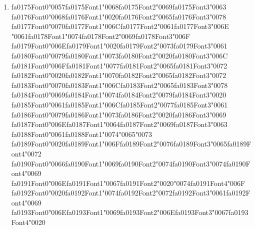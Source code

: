 \documentclass[12pt]{article}
\begin{document}
\begin{enumerate}[label=Q\arabic*.]
 \item {\csname fa0175Font0\endcsname\char"0057}{\csname fa0175Font1\endcsname\char"0068}{\csname fa0175Font2\endcsname\char"0069}{\csname fa0175Font3\endcsname\char"0063} {\csname fa0176Font0\endcsname\char"0068}{\csname fa0176Font1\endcsname\char"0020}{\csname fa0176Font2\endcsname\char"0065}{\csname fa0176Font3\endcsname\char"0078} {\csname fa0177Font0\endcsname\char"0070}{\csname fa0177Font1\endcsname\char"006C}{\csname fa0177Font2\endcsname\char"0061}{\csname fa0177Font3\endcsname\char"006E} {\char"0061}{\csname fa0178Font1\endcsname\char"0074}{\csname fa0178Font2\endcsname\char"0069}{\csname fa0178Font3\endcsname\char"006F} {\csname fa0179Font0\endcsname\char"006E}{\csname fa0179Font1\endcsname\char"0020}{\csname fa0179Font2\endcsname\char"0073}{\csname fa0179Font3\endcsname\char"0061} {\csname fa0180Font0\endcsname\char"0079}{\csname fa0180Font1\endcsname\char"0073}{\csname fa0180Font2\endcsname\char"0020}{\csname fa0180Font3\endcsname\char"006C} {\csname fa0181Font0\endcsname\char"006F}{\csname fa0181Font1\endcsname\char"0077}{\csname fa0181Font2\endcsname\char"0065}{\csname fa0181Font3\endcsname\char"0072} {\csname fa0182Font0\endcsname\char"0020}{\csname fa0182Font1\endcsname\char"0070}{\csname fa0182Font2\endcsname\char"0065}{\csname fa0182Font3\endcsname\char"0072} {\csname fa0183Font0\endcsname\char"0070}{\csname fa0183Font1\endcsname\char"006C}{\csname fa0183Font2\endcsname\char"0065}{\csname fa0183Font3\endcsname\char"0078} {\csname fa0184Font0\endcsname\char"0069}{\csname fa0184Font1\endcsname\char"0074}{\csname fa0184Font2\endcsname\char"0079}{\csname fa0184Font3\endcsname\char"0020} {\csname fa0185Font0\endcsname\char"0061}{\csname fa0185Font1\endcsname\char"006C}{\csname fa0185Font2\endcsname\char"0077}{\csname fa0185Font3\endcsname\char"0061} {\csname fa0186Font0\endcsname\char"0079}{\csname fa0186Font1\endcsname\char"0073}{\csname fa0186Font2\endcsname\char"0020}{\csname fa0186Font3\endcsname\char"0069} {\csname fa0187Font0\endcsname\char"006E}{\csname fa0187Font1\endcsname\char"0064}{\csname fa0187Font2\endcsname\char"0069}{\csname fa0187Font3\endcsname\char"0063} {\csname fa0188Font0\endcsname\char"0061}{\csname fa0188Font1\endcsname\char"0074}{\char"0065}{\char"0073} {\csname fa0189Font0\endcsname\char"0020}{\csname fa0189Font1\endcsname\char"006F}{\csname fa0189Font2\endcsname\char"0076}{\csname fa0189Font3\endcsname\char"0065}{\csname fa0189Font4\endcsname\char"0072} {\csname fa0190Font0\endcsname\char"0066}{\csname fa0190Font1\endcsname\char"0069}{\csname fa0190Font2\endcsname\char"0074}{\csname fa0190Font3\endcsname\char"0074}{\csname fa0190Font4\endcsname\char"0069} {\csname fa0191Font0\endcsname\char"006E}{\csname fa0191Font1\endcsname\char"0067}{\csname fa0191Font2\endcsname\char"0020}{\char"0074}{\csname fa0191Font4\endcsname\char"006F} {\csname fa0192Font0\endcsname\char"0020}{\csname fa0192Font1\endcsname\char"0074}{\csname fa0192Font2\endcsname\char"0072}{\csname fa0192Font3\endcsname\char"0061}{\csname fa0192Font4\endcsname\char"0069} {\csname fa0193Font0\endcsname\char"006E}{\csname fa0193Font1\endcsname\char"0069}{\csname fa0193Font2\endcsname\char"006E}{\csname fa0193Font3\endcsname\char"0067}{\csname fa0193Font4\endcsname\char"0020} 
\end{enumerate}
\end{document}
